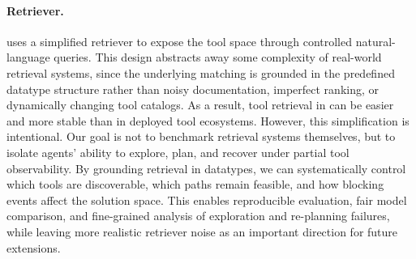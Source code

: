 
\paragraph{Retriever.} 


\bench{} uses a simplified retriever to expose the tool space through controlled natural-language queries. 
This design abstracts away some complexity of real-world retrieval systems, since the underlying matching is grounded in the predefined datatype structure rather than noisy documentation, imperfect ranking, or dynamically changing tool catalogs. 
As a result, tool retrieval in \bench{} can be easier and more stable than in deployed tool ecosystems. 
However, this simplification is intentional.
Our goal is not to benchmark retrieval systems themselves, but to isolate agents' ability to explore, plan, and recover under partial tool observability. 
By grounding retrieval in datatypes, we can systematically control which tools are discoverable, which paths remain feasible, and how blocking events affect the solution space. 
This enables reproducible evaluation, fair model comparison, and fine-grained analysis of exploration and re-planning failures, while leaving more realistic retriever noise as an important direction for future extensions.

